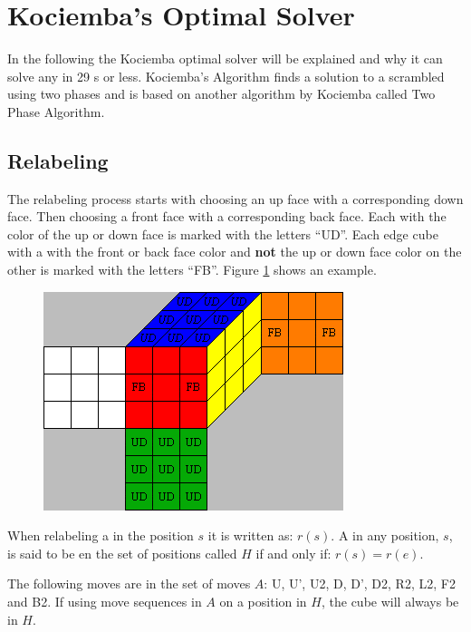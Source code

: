 \section{Kociemba's Optimal Solver}
In the following the Kociemba optimal solver\cite{kociemba09} will be explained and why it can solve any \rubik{} in 29 \twist{}s or less. Kociemba's Algorithm finds a solution to a scrambled \rubik{} using two phases and is based on another algorithm by Kociemba called Two Phase Algorithm.

\subsection{Relabeling}
The relabeling process  starts with choosing an up face with a corresponding down face. Then choosing a front face with a corresponding back face. Each \facelet{} with the color of the up or down face is marked with the letters ``UD''. Each edge cube with a \facelet{} with the front or back face color and \textbf{not} the up or down face color on the other \facelet{} is marked with the letters ``FB''. Figure \ref{fig:relabel1} shows an example.

\begin{figure}[hb]
	\centering
		\includegraphics{input/pics/relabel1}
	\caption{}
	\label{fig:relabel1}
\end{figure}

When relabeling a \rubik{} in the position $s$ it is written as: $r(s)$. A \rubik{} in any position, $s$, is said to be en the set of positions called $H$ if and only if: $r(s)=r(e)$.

The following moves are in the set of moves $A$: U, U', U2, D, D', D2, R2, L2, F2 and B2. If using move sequences in $A$ on a position in $H$, the cube will always be in $H$.



